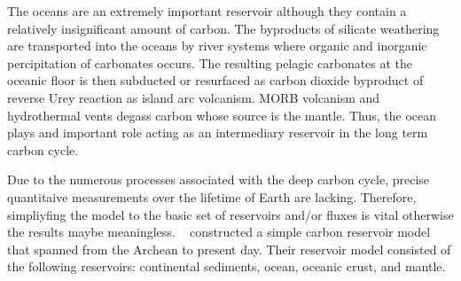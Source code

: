 The oceans are an extremely important reservoir although they contain a relatively insignificant amount of carbon. The byproducts of silicate weathering are transported into the oceans by river systems where organic and inorganic percipitation of carbonates occurs. The resulting pelagic carbonates at the oceanic floor is then subducted or resurfaced as carbon dioxide byproduct of reverse Urey reaction as island arc volcanism. MORB volcanism and hydrothermal vents degass carbon whose source is the mantle. Thus, the ocean plays and important role acting as an intermediary reservoir in the long term carbon cycle.

Due to the numerous processes associated with the deep carbon cycle, precise quantitaive measurements over the lifetime of Earth are lacking. Therefore, simpliyfing the model to the basic set of reservoirs and/or fluxes is vital otherwise the results maybe meaningless. ~\citet{SNH-ZK:2001} constructed a simple carbon reservoir model that spanned from the Archean to present day. Their reservoir model consisted of the following reservoirs: continental sediments, ocean, oceanic crust, and mantle. 